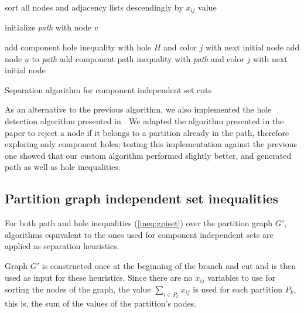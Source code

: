 \begin{algorithm}

\begin{algorithmic}

\STATE sort all nodes and adjacency lists descendingly by $x_{ij}$ value
 
	\STATE initialize \textit{path} with node $v$

	\LOOP
					\STATE add component hole inequality with hole $H$ and color $j$
					\CONTINUE with next initial node
				\ENDIF
			\ELSE
				\STATE add node $u$ to \textit{path}	
					\STATE add component path inequality with \textit{path} and color $j$
					\CONTINUE with next initial node
				\ENDIF
			\ENDIF
		\ENDFOR
	\ENDLOOP
\ENDFOR

\ENDFOR

\caption{Separation algorithm for component independent set cuts}
\label{alg:sep:ciset}

\end{algorithmic}
\end{algorithm}

As an alternative to the previous algorithm, we also implemented the hole detection algorithm presented in \cite{nikolopoulos2004hole}. We adapted the algorithm presented in the paper to reject a node if it belongs to a partition already in the path, therefore exploring only component holes; testing this implementation against the previous one showed that our custom algorithm performed slightly better, and generated path as well as hole inequalities.

\subsection{Partition graph independent set inequalities}

For both path and hole inequalities (\ref{ineq:gpiset}) over the partition graph $G'$, algorithms equivalent to the ones used for component independent sets are applied as separation heuristics.

Graph $G'$ is constructed once at the beginning of the branch and cut and is then used as input for these heuristics. Since there are no $x_{ij}$ variables to use for sorting the nodes of the graph, the value $\sum_{i \in P_k} x_{ij}$ is used for each partition $P_k$, this is, the sum of the values of the partition's nodes.

